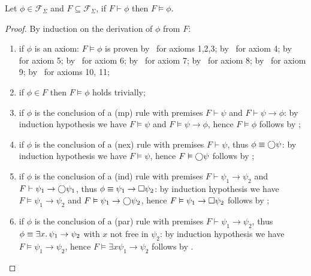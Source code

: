 \begin{theorem}[Soundness]
  Let $\phi \in \mathcal{F}_\Sigma$ and $F \subseteq \mathcal{F}_\Sigma$, if $F \vdash \phi$ then $F \vDash \phi$.
\end{theorem}
\begin{proof}
  By induction on the derivation of $\phi$ from $F$:
  \begin{enumerate}
    \item if $\phi$ is an axiom: $F \vDash \phi$ is proven by~ for axioms 1,2,3;
      by~ for axiom 4; by~ for axiom 5; by~ for axiom 6;
      by~ for axiom 7; by~ for axiom 8; by~ for axiom 9;
      by~ for axioms 10, 11;
    \item if $\phi \in F$ then $F \vDash \phi$ holds trivially;
    \item if $\phi$ is the conclusion of a (mp) rule with premises $F \vdash \psi$ and $F \vdash \psi \to \phi$: by
      induction hypothesis we have $F \vDash \psi$ and $F \vDash \psi \to \phi$, hence $F \vDash \phi$ follows by
      ;
    \item if $\phi$ is the conclusion of a (nex) rule with premises $F \vdash \psi$, thus $\phi \equiv \bigcirc{\psi}$: by
      induction hypothesis we have $F \vDash \psi$, hence $F \vDash \bigcirc{\psi}$ follows by ;
    \item if $\phi$ is the conclusion of a (ind) rule with premises $F \vdash \psi_1 \to \psi_2$ and $F \vdash \psi_1
      \to \bigcirc{\psi_1}$, thus $\phi \equiv \psi_1 \to \Box{\psi_2}$: by induction hypothesis we have $F \vDash
      \psi_1 \to \psi_2$ and $F \vDash \psi_1 \to \bigcirc{\psi_2}$, hence $F \vDash \psi_1 \to \Box{\psi_2}$ follows
      by ;
    \item if $\phi$ is the conclusion of a (par) rule with premises $F \vdash \psi_1 \to \psi_2$, thus $\phi \equiv
      \exists {x} \ldotp {\psi_1} \to \psi_2$ with $x$ not free in $\psi_2$: by induction hypothesis we have $F \vDash \psi_1
      \to \psi_2$, hence $F \vDash \exists{x}{\psi_1} \to \psi_2$ follows by .
  \end{enumerate}
\end{proof}

